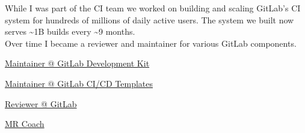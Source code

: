 \documentclass[]{matija-resume}
\begin{document}
\begin{minipage}[t]{1.0\textwidth}
\vspace{\topsep}
While I was part of the CI team we worked on building and scaling GitLab's CI system for hundreds of millions of daily active users. The system we built now serves \textasciitilde 1B builds every \textasciitilde 9 months.\\
\vspace{\topsep}
Over time I became a reviewer and maintainer for various GitLab components.
\vspace{\topsep}
\begin{tightemize}
\item \href{https://gitlab.com/gitlab-org/gitlab-development-kit/}{Maintainer @ GitLab Development Kit }
\item \href{https://gitlab.com/gitlab-org/gitlab/}{Maintainer @ GitLab CI/CD Templates }
\item \href{https://gitlab.com/gitlab-org/gitlab/}{Reviewer @ GitLab }
\item \href{https://about.gitlab.com/job-families/expert/merge-request-coach/}{MR Coach }
\end{tightemize}


\end{minipage}
\end{document}
